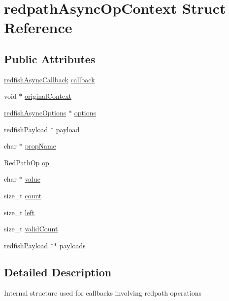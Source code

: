 \hypertarget{structredpathAsyncOpContext}{}\section{redpath\+Async\+Op\+Context Struct Reference}
\label{structredpathAsyncOpContext}
\subsection*{Public Attributes}
\begin{DoxyCompactItemize}
\item 
\hyperlink{redfishService_8h_a13c86956ea56ba1940a2b662e317264e}{redfish\+Async\+Callback} \hyperlink{structredpathAsyncOpContext_ac50c870aa8b7ee2529552a484fa6b471}{callback}
\item 
void $\ast$ \hyperlink{structredpathAsyncOpContext_aa523a807beefa636407b899608c8268c}{original\+Context}
\item 
\hyperlink{structredfishAsyncOptions}{redfish\+Async\+Options} $\ast$ \hyperlink{structredpathAsyncOpContext_a0c767a962ec9d8e342030e1b0331a45f}{options}
\item 
\hyperlink{structredfishPayload}{redfish\+Payload} $\ast$ \hyperlink{structredpathAsyncOpContext_afe71852bb8ff58bc37b6c8eecd2cdd0d}{payload}
\item 
char $\ast$ \hyperlink{structredpathAsyncOpContext_a9a46d450cf13ff95148457623f7c9d87}{prop\+Name}
\item 
Red\+Path\+Op \hyperlink{structredpathAsyncOpContext_aa5e48919de95e9c486ddc470c80a51b1}{op}
\item 
char $\ast$ \hyperlink{structredpathAsyncOpContext_a99896f99b5911f8d699c4212bdd651aa}{value}
\item 
size\+\_\+t \hyperlink{structredpathAsyncOpContext_abc510ebbe2744f327cd0006b6dfaba23}{count}
\item 
size\+\_\+t \hyperlink{structredpathAsyncOpContext_ac1dd09aaa41b7d1fb7b912e026b7b994}{left}
\item 
size\+\_\+t \hyperlink{structredpathAsyncOpContext_a823ad5ca475b0f36527b6502e5b1f1a9}{valid\+Count}
\item 
\hyperlink{structredfishPayload}{redfish\+Payload} $\ast$$\ast$ \hyperlink{structredpathAsyncOpContext_a261f287b72dcdf3a75f80b98eda9050e}{payloads}
\end{DoxyCompactItemize}


\subsection{Detailed Description}
Internal structure used for callbacks involving redpath operations 

